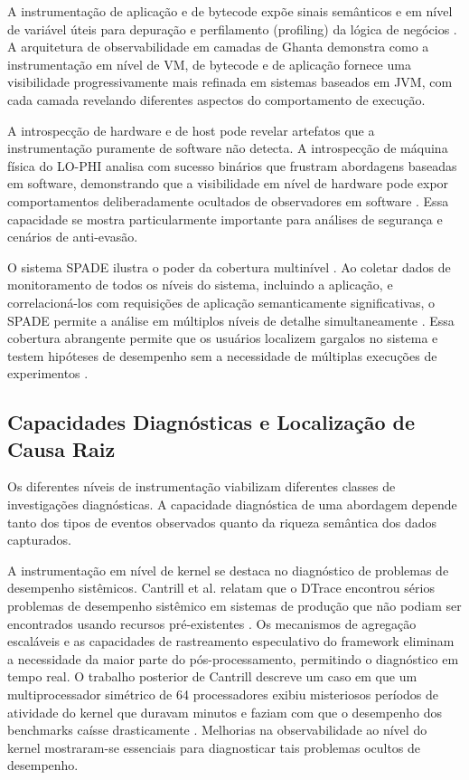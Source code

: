 \documentclass[sigconf, anonymous]{acmart}
\begin{document}
A instrumentação de aplicação e de bytecode expõe sinais semânticos e em nível de variável úteis para depuração e perfilamento (profiling) da lógica de negócios \cite{wang_2025}. A arquitetura de observabilidade em camadas de Ghanta \cite{ghanta_2017} demonstra como a instrumentação em nível de VM, de bytecode e de aplicação fornece uma visibilidade progressivamente mais refinada em sistemas baseados em JVM, com cada camada revelando diferentes aspectos do comportamento de execução.

A introspecção de hardware e de host pode revelar artefatos que a instrumentação puramente de software não detecta. A introspecção de máquina física do LO-PHI analisa com sucesso binários que frustram abordagens baseadas em software, demonstrando que a visibilidade em nível de hardware pode expor comportamentos deliberadamente ocultados de observadores em software \cite{spensky_2016}. Essa capacidade se mostra particularmente importante para análises de segurança e cenários de anti-evasão.

O sistema SPADE ilustra o poder da cobertura multinível \cite{brown_2003}. Ao coletar dados de monitoramento de todos os níveis do sistema, incluindo a aplicação, e correlacioná-los com requisições de aplicação semanticamente significativas, o SPADE permite a análise em múltiplos níveis de detalhe simultaneamente \cite{brown_2003}. Essa cobertura abrangente permite que os usuários localizem gargalos no sistema e testem hipóteses de desempenho sem a necessidade de múltiplas execuções de experimentos \cite{brown_2003}.

\subsection{Capacidades Diagnósticas e Localização de Causa Raiz}

Os diferentes níveis de instrumentação viabilizam diferentes classes de investigações diagnósticas. A capacidade diagnóstica de uma abordagem depende tanto dos tipos de eventos observados quanto da riqueza semântica dos dados capturados.

A instrumentação em nível de kernel se destaca no diagnóstico de problemas de desempenho sistêmicos. Cantrill et al. relatam que o DTrace encontrou sérios problemas de desempenho sistêmico em sistemas de produção que não podiam ser encontrados usando recursos pré-existentes \cite{cantrill_2004}. Os mecanismos de agregação escaláveis e as capacidades de rastreamento especulativo do framework eliminam a necessidade da maior parte do pós-processamento, permitindo o diagnóstico em tempo real. O trabalho posterior de Cantrill descreve um caso em que um multiprocessador simétrico de 64 processadores exibiu misteriosos períodos de atividade do kernel que duravam minutos e faziam com que o desempenho dos benchmarks caísse drasticamente \cite{cantrill_2006}. Melhorias na observabilidade ao nível do kernel mostraram-se essenciais para diagnosticar tais problemas ocultos de desempenho.
\end{document}
